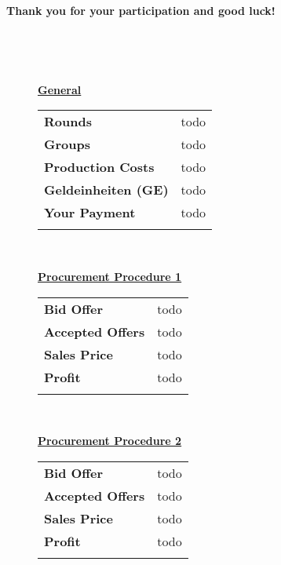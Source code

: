 \documentclass[11pt]{article}
\begin{document}
   \addvspace{1.5cm}
   
\textbf{Thank you for your participation and good luck!}
 
 
~\newpage

\begin{figure}[ht!] 
	\begin{minipage}[t]{1\linewidth} 
		\begin{tcolorbox}[arc=0pt,colframe=black!25]
			
			~\par
			
			\textbf{\underline{General}} ~\bigskip

				\begin{tabular}{ll}
					\textbf{Rounds} 				& todo \\
					\textbf{Groups} 				& todo \\
					\textbf{Production Costs} 		& todo \\
					\textbf{Geldeinheiten (GE)} 	& todo \\
					\textbf{Your Payment} 			& todo \\
					\hspace{3.75cm}					& 	   \\					
				\end{tabular} ~\bigskip
			
			\textbf{\underline{Procurement Procedure 1}} ~\bigskip

				\begin{tabular}{ll}
					\textbf{Bid Offer} 				& todo \\
					\textbf{Accepted Offers} 		& todo \\
					\textbf{Sales Price} 			& todo \\
					\textbf{Profit}					& todo \\
					\hspace{3.75cm}					& 	   \\
				\end{tabular} ~\bigskip
		
			\textbf{\underline{Procurement Procedure 2}} ~\bigskip

				\begin{tabular}{ll}
					\textbf{Bid Offer} 				& todo \\
					\textbf{Accepted Offers} 		& todo \\
					\textbf{Sales Price}			& todo \\
					\textbf{Profit}		 			& todo \\
					\hspace{3.75cm}					& 	   \\
				\end{tabular} ~\bigskip
  
		\end{tcolorbox} 
	\end{minipage}  
\end{figure}


~\newpage


\end{document}
